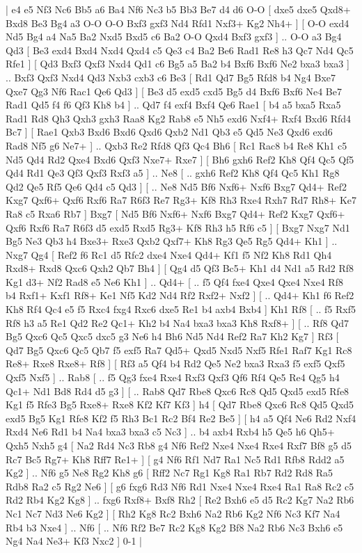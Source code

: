 \makegametitle 
|   e4   e5    Nf3   Nc6    Bb5   a6    Ba4   Nf6    Nc3   b5    Bb3   Be7    d4   d6    O-O [  dxe5 dxe5  Qxd8+ Bxd8  Be3 Bg4  a3 O-O  O-O Bxf3  gxf3 Nd4  Rfd1 Nxf3+  Kg2 Nh4+   ]  [  O-O exd4  Nd5 Bg4  a4 Na5  Ba2 Nxd5  Bxd5 c6  Ba2 O-O  Qxd4 Bxf3  gxf3   ] .. O-O    a3   Bg4    Qd3 [  Be3 exd4  Bxd4 Nxd4  Qxd4 c5  Qe3 c4  Ba2 Be6  Rad1 Re8  h3 Qc7  Nd4 Qc5  Rfe1   ]  [  Qd3 Bxf3  Qxf3 Nxd4  Qd1 c6  Bg5 a5  Ba2 b4  Bxf6 Bxf6  Ne2 bxa3  bxa3   ] .. Bxf3    Qxf3   Nxd4    Qd3   Nxb3    cxb3   c6    Be3 [  Rd1 Qd7  Bg5 Rfd8  b4 Ng4  Bxe7 Qxe7  Qg3 Nf6  Rac1 Qe6  Qd3   ]  [  Be3 d5  exd5 cxd5  Bg5 d4  Bxf6 Bxf6  Ne4 Be7  Rad1 Qd5  f4 f6  Qf3 Kh8  b4   ] .. Qd7    f4   exf4    Bxf4   Qe6    Rae1 [  b4 a5  bxa5 Rxa5  Rad1 Rd8  Qh3 Qxh3  gxh3 Raa8  Kg2 Rab8  e5 Nh5  exd6 Nxf4+  Rxf4 Bxd6  Rfd4 Bc7   ]  [  Rae1 Qxb3  Bxd6 Bxd6  Qxd6 Qxb2  Nd1 Qb3  e5 Qd5  Ne3 Qxd6  exd6 Rad8  Nf5 g6  Ne7+   ] .. Qxb3    Re2   Rfd8    Qf3   Qc4    Bh6 [  Rc1 Rac8  b4 Re8  Kh1 c5  Nd5 Qd4  Rd2 Qxe4  Bxd6 Qxf3  Nxe7+ Rxe7   ]  [  Bh6 gxh6  Ref2 Kh8  Qf4 Qc5  Qf5 Qd4  Rd1 Qe3  Qf3 Qxf3  Rxf3 a5   ] .. Ne8 [ .. gxh6  Ref2 Kh8  Qf4 Qc5  Kh1 Rg8  Qd2 Qe5  Rf5 Qe6  Qd4 c5  Qd3   ]  [ .. Ne8  Nd5 Bf6  Nxf6+ Nxf6  Bxg7 Qd4+  Ref2 Kxg7  Qxf6+ Qxf6  Rxf6 Ra7  R6f3 Re7  Rg3+ Kf8  Rh3 Rxe4  Rxh7 Rd7  Rh8+ Ke7  Ra8 c5  Rxa6 Rb7   ]  Bxg7 [  Nd5 Bf6  Nxf6+ Nxf6  Bxg7 Qd4+  Ref2 Kxg7  Qxf6+ Qxf6  Rxf6 Ra7  R6f3 d5  exd5 Rxd5  Rg3+ Kf8  Rh3 h5  Rf6 c5   ]  [  Bxg7 Nxg7  Nd1 Bg5  Ne3 Qb3  h4 Bxe3+  Rxe3 Qxb2  Qxf7+ Kh8  Rg3 Qe5  Rg5 Qd4+  Kh1   ] .. Nxg7    Qg4 [  Ref2 f6  Rc1 d5  Rfc2 dxe4  Nxe4 Qd4+  Kf1 f5  Nf2 Kh8  Rd1 Qh4  Rxd8+ Rxd8  Qxc6 Qxh2  Qb7 Bh4   ]  [  Qg4 d5  Qf3 Bc5+  Kh1 d4  Nd1 a5  Rd2 Rf8  Kg1 d3+  Nf2 Rad8  e5 Ne6  Kh1   ] .. Qd4+ [ .. f5  Qf4 fxe4  Qxe4 Qxe4  Nxe4 Rf8  b4 Rxf1+  Kxf1 Rf8+  Ke1 Nf5  Kd2 Nd4  Rf2 Rxf2+  Nxf2   ]  [ .. Qd4+  Kh1 f6  Ref2 Kh8  Rf4 Qc4  e5 f5  Rxc4 fxg4  Rxc6 dxe5  Re1 b4  axb4 Bxb4   ]  Kh1   Rf8 [ .. f5  Rxf5 Rf8  h3 a5  Re1 Qd2  Re2 Qc1+  Kh2 b4  Na4 bxa3  bxa3 Kh8  Rxf8+   ]  [ .. Rf8  Qd7 Bg5  Qxc6 Qc5  Qxc5 dxc5  g3 Ne6  h4 Bh6  Nd5 Nd4  Ref2 Ra7  Kh2 Kg7   ]  Rf3 [  Qd7 Bg5  Qxc6 Qc5  Qb7 f5  exf5 Ra7  Qd5+ Qxd5  Nxd5 Nxf5  Rfe1 Raf7  Kg1 Rc8  Re8+ Rxe8  Rxe8+ Rf8   ]  [  Rf3 a5  Qf4 b4  Rd2 Qe5  Ne2 bxa3  Rxa3 f5  exf5 Qxf5  Qxf5 Nxf5   ] .. Rab8 [ .. f5  Qg3 fxe4  Rxe4 Rxf3  Qxf3 Qf6  Rf4 Qe5  Re4 Qg5  h4 Qc1+  Nd1 Bd8  Rd4 d5  g3   ]  [ .. Rab8  Qd7 Rbe8  Qxc6 Rc8  Qd5 Qxd5  exd5 Rfe8  Kg1 f5  Rfe3 Bg5  Rxe8+ Rxe8  Kf2 Kf7  Kf3   ]  h4 [  Qd7 Rbe8  Qxc6 Rc8  Qd5 Qxd5  exd5 Bg5  Kg1 Rfe8  Kf2 f5  Rh3 Bc1  Rc2 Bf4  Re2 Be5   ]  [  h4 a5  Qf4 Ne6  Rd2 Nxf4  Rxd4 Ne6  Rd1 b4  Na4 bxa3  bxa3 c5  Nc3   ] .. b4    axb4   Rxb4    h5   Qe5    h6   Qh5+    Qxh5   Nxh5    g4 [  Na2 Rd4  Nc3 Rb8  g4 Nf6  Ref2 Nxe4  Nxe4 Rxe4  Rxf7 Bf8  g5 d5  Rc7 Bc5  Rg7+ Kh8  Rff7 Re1+   ]  [  g4 Nf6  Rf1 Nd7  Ra1 Nc5  Rd1 Rfb8  Rdd2 a5  Kg2   ] .. Nf6    g5   Ne8    Rg2   Kh8    g6 [  Rff2 Nc7  Rg1 Kg8  Ra1 Rb7  Rd2 Rd8  Ra5 Rdb8  Ra2 c5  Rg2 Ne6   ]  [  g6 fxg6  Rd3 Nf6  Rd1 Nxe4  Nxe4 Rxe4  Ra1 Ra8  Rc2 c5  Rd2 Rb4  Kg2 Kg8   ] .. fxg6    Rxf8+   Bxf8   Rh2 [  Re2 Bxh6  e5 d5  Rc2 Kg7  Na2 Rb6  Nc1 Nc7  Nd3 Ne6  Kg2   ]  [  Rh2 Kg8  Rc2 Bxh6  Na2 Rb6  Kg2 Nf6  Nc3 Kf7  Na4 Rb4  b3 Nxe4   ] .. Nf6    [ .. Nf6  Rf2 Be7  Rc2 Kg8  Kg2 Bf8  Na2 Rb6  Nc3 Bxh6  e5 Ng4  Na4 Ne3+  Kf3 Nxc2   ] 0-1  |
